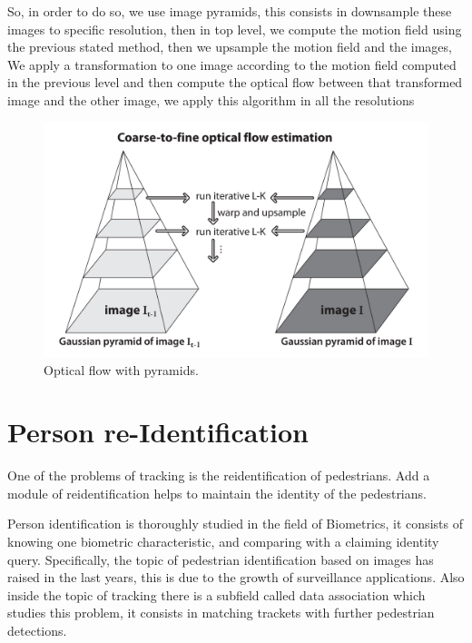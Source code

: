 So, in order to do so, we use image pyramids, this consists in downsample these images to specific resolution, then in top level, we compute the motion field using the previous stated method, then 
we upsample the motion field and the images, We apply a transformation to one image according to the motion field computed in the previous level and then compute the optical flow between that 
transformed image and the other image, we apply this algorithm in all the resolutions



\begin{figure}[H]
\centering         
\includegraphics[width=0.6\linewidth]{lucasKanade/piram.png}
\caption{Optical flow with pyramids.} \label{corner}
\end{figure}





\section{Person re-Identification}\label{misMatch}

One of the problems of tracking is the reidentification of pedestrians. Add a module of reidentification helps to maintain the identity of the pedestrians.



Person identification is thoroughly studied in the field of Biometrics, it consists of  knowing one biometric characteristic, and comparing with a claiming identity query. Specifically, the topic of pedestrian identification based on images has raised in the last years, this is due to the growth of surveillance applications. Also inside the topic of tracking there is a subfield called data association which studies this problem, it consists in matching trackets with further pedestrian detections.

